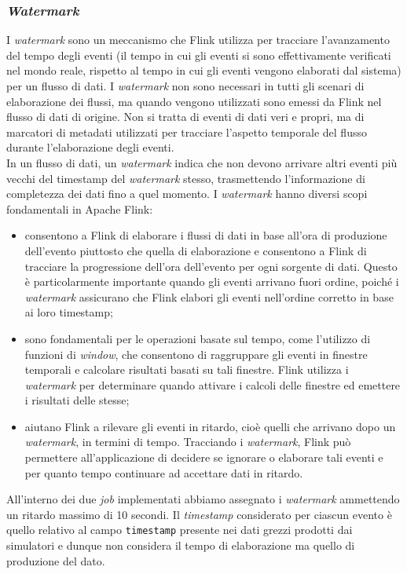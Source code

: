 \subsubsection{\textit{Watermark}}\label{watermark}
I \textit{watermark} sono un meccanismo che Flink utilizza per tracciare l'avanzamento del tempo degli eventi
(il tempo in cui gli eventi si sono effettivamente verificati nel mondo reale, rispetto al tempo in cui gli eventi vengono elaborati dal sistema)
per un flusso di dati. I \textit{watermark} non sono necessari in tutti gli scenari di elaborazione dei flussi,
ma quando vengono utilizzati sono emessi da Flink nel flusso di dati di origine.
Non si tratta di eventi di dati veri e propri, ma di marcatori di metadati utilizzati per tracciare l'aspetto temporale del flusso durante l'elaborazione degli eventi.\\
In un flusso di dati, un \textit{watermark} indica che non devono arrivare altri eventi più vecchi del timestamp del \textit{watermark} stesso,
trasmettendo l'informazione di completezza dei dati fino a quel momento.
I \textit{watermark} hanno diversi scopi fondamentali in Apache Flink:
\begin{itemize}
	\item consentono a Flink di elaborare i flussi di dati in base all'ora di produzione dell'evento piuttosto che quella di elaborazione e consentono a Flink
	      di tracciare la progressione dell'ora dell'evento per ogni sorgente di dati. Questo è particolarmente importante quando gli eventi arrivano fuori ordine,
	      poiché i \textit{watermark} assicurano che Flink elabori gli eventi nell'ordine corretto in base ai loro timestamp;
	\item sono fondamentali per le operazioni basate sul tempo, come l'utilizzo di funzioni di \textit{window}, che consentono di raggruppare gli eventi in finestre temporali
	      e calcolare risultati basati su tali finestre. Flink utilizza i \textit{watermark} per determinare quando attivare i calcoli delle finestre ed emettere i risultati delle stesse;
	\item aiutano Flink a rilevare gli eventi in ritardo, cioè quelli che arrivano dopo un \textit{watermark}, in termini di tempo.
	      Tracciando i \textit{watermark}, Flink può permettere all'applicazione di decidere se ignorare o elaborare tali eventi e per quanto tempo continuare ad accettare dati in ritardo.
\end{itemize}
All'interno dei due \textit{job} implementati abbiamo assegnato i \textit{watermark} ammettendo un ritardo massimo di 10 secondi. Il \textit{timestamp} considerato per
ciascun evento è quello relativo al campo \texttt{timestamp} presente nei dati grezzi prodotti dai simulatori e dunque non considera il tempo di elaborazione ma quello di produzione del dato.

